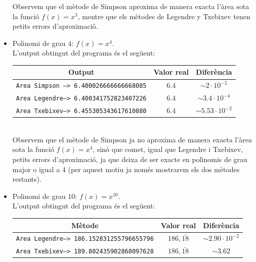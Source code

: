 \documentclass[12pt]{article}
\begin{document}
\begin{itemize}
     Observem que el mètode de Simpson aproxima de manera exacta l'àrea sota la funció $f(x)=x^3$, mentre que els mètodes de Legendre y Txebixev tenen petits errors d'aproximació.
      
    \newpage 
    \item Polinomi de grau $4$: $f(x) = x^4$.\\
    L'output obtingut del programa és el següent:
          \begin{table}[h]
            \begin{center}
            \begin{tabular}{ c | c | c }
            \textbf{Output} & \textbf{Valor real}  & \textbf{Diferència}\\ \hline
            \texttt{Area Simpson --> 6.400026666666668085} & $6.4$ & $\sim2\cdot 10^{-5}$\\ 
            \texttt{Area Legendre--> 6.400341752823407226} & $6.4$ & $\sim3.4\cdot 10^{-4}$\\ 
            \texttt{Area Txebixev--> 6.455305343617610880} & $6.4$ & $\sim5.53\cdot 10^{-2}$\\
            \end{tabular}
            \end{center}
        \end{table}\\
        Observem que el mètode de Simpson ja no aproxima de manera exacta l'àrea sota la funció $f(x)=x^4$, sinó que comet, igual que Legendre i Txebixev, petits errors d'aproximació, ja que deixa de ser exacte en polinomis de grau major o igual a 4 (per aquest motiu ja només mostrarem els dos mètodes restants).
    \item Polinomi de grau $10$: $f(x) = x^{10}$.\\
     L'output obtingut del programa és el següent:
          \begin{table}[h]
            \begin{center}
            \begin{tabular}{ c | c | c }
            \textbf{Mètode} & \textbf{Valor real}  & \textbf{Diferència}\\ \hline
            \texttt{Area Legendre--> 186.152831255796655796} & $186,\bar{18}$ & $\sim2.90\cdot 10^{-2}$\\ 
            \texttt{Area Txebixev--> 189.802435902868097628} & $186,\bar{18}$ & $\sim3.62$ \\ 
            \end{tabular}
            \end{center}
        \end{table}
        

\end{itemize}
\end{document}
